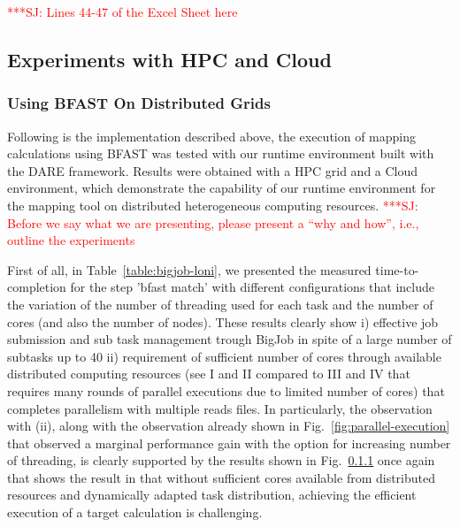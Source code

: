 \documentclass[12pt]{article}
\newcommand{\jhanote}[1]{ {\textcolor{red}     {***SJ: #1}}}
\newcommand{\jhanote}[1]{}
\begin{document}
\jhanote{Lines 44-47 of the Excel Sheet here}

\subsection{Experiments with HPC and Cloud}

\subsubsection{Using BFAST On Distributed Grids}

Following is the implementation described above, the execution of mapping calculations using BFAST was tested with our runtime environment built with the DARE framework.   Results were obtained with a HPC grid and a Cloud environment, which demonstrate the capability of our runtime environment for the mapping tool on distributed heterogeneous computing resources. \jhanote{Before we say what we are presenting, please present a ``why and how'', i.e., outline the experiments} 

First of all, in Table~\ref{table:bigjob-loni}, we presented the measured time-to-completion for the step 'bfast match' with different configurations that include the variation of the number of threading used for each task and the number of cores (and also the number of nodes).   These results clearly show i) effective job submission and sub task management trough BigJob in spite of a large number of subtasks up to 40 ii) requirement of sufficient number of cores through available distributed computing resources (see I and II compared to III and IV that requires many rounds of parallel executions due to limited number of cores) that completes parallelism with multiple reads files.  In particularly, the observation with (ii), along with the observation already shown in Fig.~\ref{fig:parallel-execution} that observed a marginal performance gain with the option for increasing number of threading, is clearly supported by the results shown in Fig.~\ref{} once again that shows the result in that without sufficient cores available from distributed resources and dynamically adapted task distribution, achieving the efficient execution of a target calculation is challenging.
\end{document}
